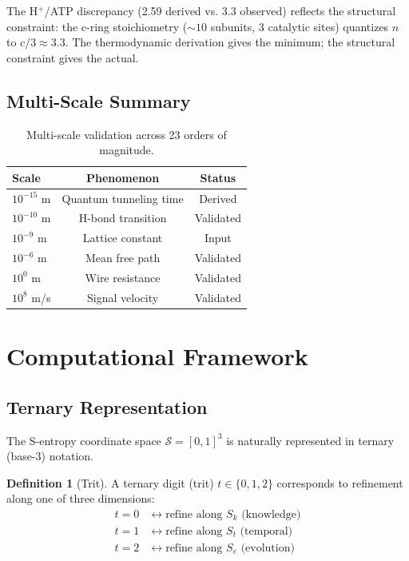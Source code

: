 \documentclass[twocolumn,10pt]{article}
\theoremstyle{definition}
\newtheorem{definition}[theorem]{Definition}
\theoremstyle{remark}
\newcommand{\Sk}{S_k}
\newcommand{\St}{S_t}
\newcommand{\Se}{S_e}
\begin{document}
The H$^+$/ATP discrepancy (2.59 derived vs. 3.3 observed) reflects the structural constraint: the c-ring stoichiometry ($\sim 10$ subunits, 3 catalytic sites) quantizes $n$ to $c/3 \approx 3.3$. The thermodynamic derivation gives the minimum; the structural constraint gives the actual.

\subsection{Multi-Scale Summary}

\begin{table}[h]
\centering
\begin{tabular}{lcc}
\toprule
\textbf{Scale} & \textbf{Phenomenon} & \textbf{Status} \\
\midrule
$10^{-15}$ m & Quantum tunneling time & Derived \\
$10^{-10}$ m & H-bond transition & Validated \\
$10^{-9}$ m & Lattice constant & Input \\
$10^{-6}$ m & Mean free path & Validated \\
$10^{0}$ m & Wire resistance & Validated \\
$10^{8}$ m/s & Signal velocity & Validated \\
\bottomrule
\end{tabular}
\caption{Multi-scale validation across 23 orders of magnitude.}
\label{tab:multiscale}
\end{table}

\section{Computational Framework}
\label{sec:computational}

\subsection{Ternary Representation}

The S-entropy coordinate space $\mathcal{S} = [0,1]^3$ is naturally represented in ternary (base-3) notation.

\begin{definition}[Trit]
\label{def:trit}
A ternary digit (trit) $t \in \{0, 1, 2\}$ corresponds to refinement along one of three dimensions:
\begin{align}
t = 0 &\leftrightarrow \text{refine along } \Sk \text{ (knowledge)} \\
t = 1 &\leftrightarrow \text{refine along } \St \text{ (temporal)} \\
t = 2 &\leftrightarrow \text{refine along } \Se \text{ (evolution)}
\end{align}
\end{definition}
\end{document}
